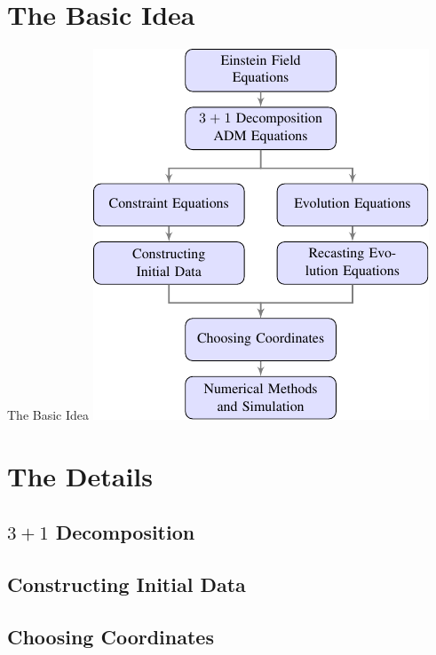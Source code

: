 \documentclass[aspectratio=169]{beamer}
\begin{document}
  \section{The Basic Idea} %
  \label{sec:the_basic_idea}
    \begin{frame}{The Basic Idea}
      \center
      \includegraphics{figures/basic_idea_scheme.pdf}
    \end{frame}

  \section{The Details} %
  \label{sec:the_details}
    \subsection{$3+1$ Decomposition} %
    \label{sec:section_name}


    \subsection{Constructing Initial Data} %
    \label{sec:constructing_initial_data}


    \subsection{Choosing Coordinates} %
    \label{sec:choosing_coordinates}
\end{document}
